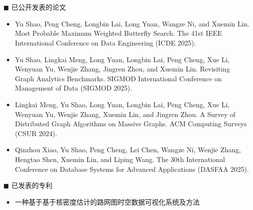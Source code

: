 \chapter*{}
\vskip 5mm

  {\heiti $\blacksquare$ 已公开发表的论文}\vskip 5mm

\begin{itemize}
  \item 
  Yu Shao, Peng Cheng, Longbin Lai, Long Yuan, Wangze Ni, and Xuemin Lin. Most Probable Maximum Weighted Butterfly Search. The 41st IEEE International Conference on Data Engineering (ICDE 2025).

  \item 
  Yu Shao, Lingkai Meng, Long Yuan, Longbin Lai, Peng Cheng, Xue Li, Wenyuan Yu, Wenjie Zhang, Jingren Zhou, and Xuemin Lin. Revisiting Graph Analytics Benchmarks. SIGMOD International Conference on Management of Data (SIGMOD 2025).

  \item 
  Lingkai Meng, Yu Shao, Long Yuan, Longbin Lai, Peng Cheng, Xue Li, Wenyuan Yu, Wenjie Zhang, Xuemin Lin, and Jingren Zhou. A Survey of Distributed Graph Algorithms on Massive Graphs. ACM Computing Surveys (CSUR 2024).

  \item 
  Qinzhou Xiao, Yu Shao, Peng Cheng, Lei Chen, Wangze Ni, Wenjie Zhang, Hengtao Shen, Xuemin Lin, and Liping Wang. 
  The 30th International Conference on Database Systems for Advanced Applications (DASFAA 2025).
\end{itemize}

\bigskip\bigskip

{\heiti $\blacksquare$ 已发表的专利}\vskip 5mm

\begin{itemize}
  \item 一种基于基于核密度估计的路网图时空数据可视化系统及方法
\end{itemize}
